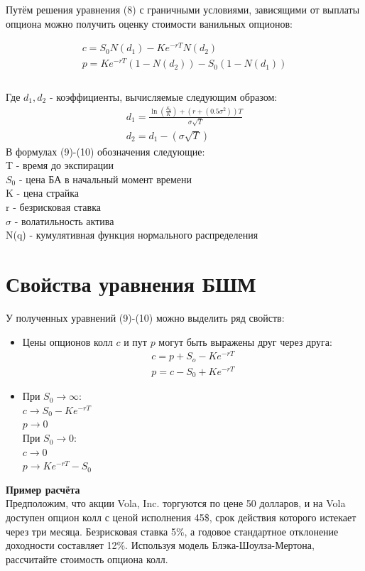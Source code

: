 \documentclass{article}
\begin{document}
Путём решения уравнения (8) с граничными условиями, зависящими от выплаты опциона можно получить оценку стоимости ванильных опционов:

\begin{equation}
\begin{gathered}
c=S_0 N\left(d_1\right)-K e^{-r T} N\left(d_2\right) \\
p=K e^{-r T}\left(1-N\left(d_2\right)\right)-S_0\left(1-N\left(d_1\right)\right) \\
\end{gathered}
\end{equation}\\
Где $d_1, d_2 $ - коэффициенты, вычисляемые следующим образом:
\begin{equation}
    \begin{gathered}
        d_1=\frac{\ln \left(\frac{S_0}{K}\right)+\left(r+\left(0.5 \sigma^2\right)\right) T}{\sigma \sqrt{T}}\\
        d_2=d_1-(\sigma \sqrt{T})
    \end{gathered}
\end{equation}
В формулах (9)-(10) обозначения следующие:\\
T - время до экспирации\\
$S_0$ - цена БА в начальный момент времени\\
K - цена страйка\\
r - безрисковая ставка\\
$\sigma$ - волатильность актива\\
N(q) - кумулятивная функция нормального распределения

\section{Свойства уравнения БШМ}
У полученных уравнений (9)-(10) можно выделить ряд свойств:
\begin{itemize}
    \item Цены опционов колл $c$ и пут $p$ могут быть выражены друг через друга:
    \begin{equation*}
\begin{gathered}
        c=p+S_o-Ke^{-rT}\\
        p=c-S_0+Ke^{-rT}
\end{gathered}
    \end{equation*}
    \item При $S_0 \to \infty$: \\$c\to S_0-Ke^{-rT}$\\$p \to 0$\\
          При $S_0 \to 0$: \\$c \to 0$\\$p \to Ke^{-rT}-S_0$
\end{itemize}
\textbf{Пример расчёта}\\
Предположим, что акции Vola, Inc. торгуются по цене 50 долларов, и на
Vola доступен опцион колл с ценой исполнения 45\$, срок действия которого истекает
через три месяца. Безрисковая ставка 5\%,
а годовое стандартное отклонение доходности составляет 12\%. Используя модель
Блэка-Шоулза-Мертона, рассчитайте стоимость опциона колл.
\end{document}
